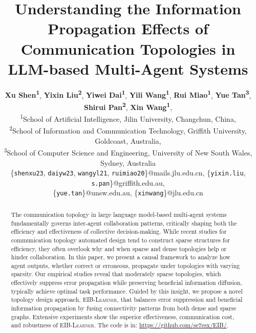 \documentclass[11pt]{article}
\title{Understanding the Information Propagation Effects of Communication Topologies in LLM-based Multi-Agent Systems}
\author{
\textbf{Xu Shen\textsuperscript{1}\footnotemark[1]},
 \textbf{Yixin Liu\textsuperscript{2}\footnotemark[1]},
 \textbf{Yiwei Dai\textsuperscript{1}},
 \textbf{Yili Wang\textsuperscript{1}},
 \textbf{Rui Miao\textsuperscript{1}},
 \textbf{Yue Tan\textsuperscript{3}},
 \textbf{Shirui Pan\textsuperscript{2}},
 \textbf{Xin Wang\textsuperscript{1}\footnotemark[2]},
 \\
 \textsuperscript{1}School of Artificial Intelligence, Jilin University, Changchun, China,
 \\
 \textsuperscript{2}School of Information and Communication Technology, Griffith University, Goldcoast, Australia,
 \\
 \textsuperscript{3}School of Computer Science and Engineering, University of New South Wales, Sydney, Australia
 \\
 \{\texttt{shenxu23}, \texttt{daiyw23}, \texttt{wangyl21}, \texttt{ruimiao20}\}@mails.jlu.edu.cn, 
 \{\texttt{yixin.liu}, \texttt{s.pan}\}@griffith.edu.au, \\
 \{\texttt{yue.tan}\}@unsw.edu.au, 
 \{\texttt{xinwang}\}@jlu.edu.cn
}
\newcommand{\ourmethod}{\textsc{{EIB-Learner}}\xspace}
\begin{document}
\maketitle
{}
\begin{abstract}
The communication topology in large language model-based multi-agent systems fundamentally governs inter-agent collaboration patterns, critically shaping both the efficiency and effectiveness of collective decision-making. While recent studies for communication topology automated design tend to construct sparse structures for efficiency, they often overlook why and when sparse and dense topologies help or hinder collaboration. 
In this paper, we present a causal framework to analyze how agent outputs, whether correct or erroneous, propagate under topologies with varying sparsity. Our empirical studies reveal that moderately sparse topologies, which effectively suppress error propagation while preserving beneficial information diffusion, typically achieve optimal task performance. 
Guided by this insight, we propose a novel topology design approach, \ourmethod, that balances error suppression and beneficial information propagation by fusing connectivity patterns from both dense and sparse graphs. Extensive experiments show the superior effectiveness, communication cost, and robustness of \ourmethod. The code is in: \href{https://github.com/se7esx/EIB/}{https://github.com/se7esx/EIB/}.

\end{abstract}
\end{document}
